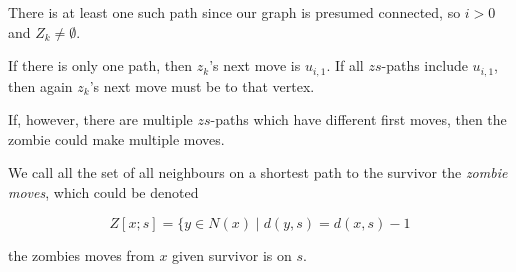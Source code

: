 There is at least one such path since our graph is presumed connected,
so $i > 0$ and $Z_k \neq \emptyset$.

If there is only one path, then $z_k$'s next move is $u_{i, 1}$. If all $zs$-paths
include $u_{i,1}$, then again $z_k$'s next move must be to that vertex.

If, however, there are multiple $zs$-paths which have different first moves,
then the zombie could make multiple moves.

We call all the set of all neighbours on
a shortest path to the survivor the \textit{zombie moves}, which could be denoted

\[ Z[x; s] = \{ y \in N(x) \mid d(y, s) = d(x, s) - 1 \]

the zombies moves from $x$ given survivor is on $s$.
